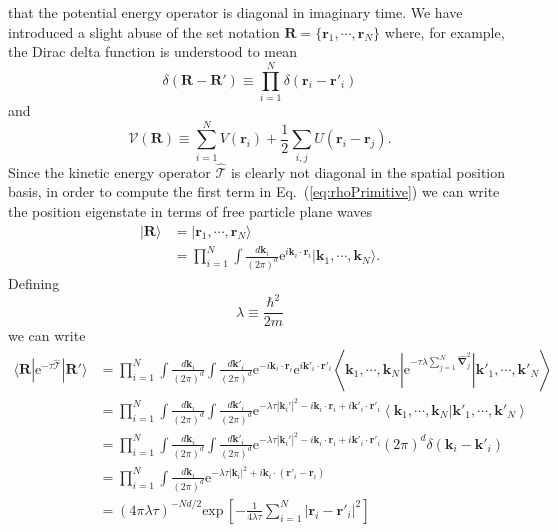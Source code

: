 \documentclass[prb,aps,amssym,nofootinbib,floatfix,notitlepage]{revtex4-1}
\renewcommand{\vec}[1]{\boldsymbol{#1}}
\newcommand{\e}[1]{\mathrm{e}^{#1}}
\renewcommand{\eqref}[1]{Eq.~(\ref{#1})}
\newcommand{\R}{\vec{R}}
\newcommand{\T}{\mathcal{T}}
\begin{document}
that the potential energy operator is diagonal in imaginary time. We have
introduced a slight abuse of the set notation
$\R = \{\vec{r}_1, \cdots, \vec{r}_N \}$ where, for example, the Dirac delta
function is understood to mean
%
\begin{equation}
    \delta(\R-\R') \equiv \prod_{i=1}^{N}\delta(\vec{r}_i-\vec{r}'_i)
\end{equation}
%
and 
%
\begin{equation}
    \mathcal{V}(\R) \equiv \sum_{i=1}^N V(\vec{r}_i) + \frac{1}{2}\sum_{i,j}
U(\vec{r}_i-\vec{r}_j).
\end{equation}
%
Since the kinetic energy operator $\hat{\T}$ is clearly not diagonal in the
spatial position basis, in order to compute the first term in
\eqref{eq:rhoPrimitive} we can write the position eigenstate in terms of free
particle plane waves
%
\begin{align}
    |\R \rangle &=  | \vec{r}_1, \cdots, \vec{r}_N \rangle \nonumber \\
                &= \prod_{i=1}^N \int \frac{d\vec{k}_i}{(2\pi)^d} 
    \e{i \vec{k}_i \cdot \vec{r}_i} | \vec{k}_1, \cdots, \vec{k}_N\rangle.
\end{align}
%
Defining
%
\begin{equation}
    \lambda \equiv \frac{\hbar^2}{2 m}
\end{equation}
%
we can write
%
\begin{align}
    \langle \R | \e{-\tau\hat{\T}}|\R'\rangle &= \prod_{i=1}^N 
    \int \frac{d\vec{k}_i}{(2\pi)^d} \int \frac{d\vec{k}'_i}{(2\pi)^d} 
    \e{-i \vec{k}_i \cdot \vec{r}_i} \e{i \vec{k}'_i \cdot \vec{r}'_i} 
    \left \langle \vec{k}_1, \cdots, \vec{k}_N \left | \e{-\tau \lambda
\sum_{j=1}^N\hat{\vec{\nabla}}_j^2} \right | \vec{k}'_1, \cdots, \vec{k}'_N
\right \rangle \nonumber \\
&= \prod_{i=1}^N\int \frac{d\vec{k}_i}{(2\pi)^d} \int \frac{d\vec{k}'_i}{(2\pi)^d} 
\e{-\lambda \tau |\vec{k}_i'|^2 - i \vec{k}_i \cdot \vec{r}_i + i \vec{k}'_i \cdot
\vec{r}'_i} \left \langle \vec{k}_1, \cdots, \vec{k}_N | \vec{k}'_1, \cdots,
\vec{k}'_N \right \rangle \nonumber \\
&= \prod_{i=1}^N\int \frac{d\vec{k}_i}{(2\pi)^d} \int \frac{d\vec{k}'_i}{(2\pi)^d} 
\e{-\lambda \tau |\vec{k}_i'|^2 - i \vec{k}_i \cdot \vec{r}_i + i \vec{k}'_i \cdot
\vec{r}'_i}  (2\pi)^d \delta(\vec{k}_i-\vec{k}'_i) \nonumber \\
&= \prod_{i=1}^N\int \frac{d\vec{k}_i}{(2\pi)^d} 
\e{-\lambda \tau |\vec{k}_i|^2 + i \vec{k}_i \cdot (\vec{r}'_i - \vec{r}_i)}  
\nonumber \\
&= (4\pi \lambda \tau)^{-Nd/2} \mathrm{exp}\,\left[ -\frac{1}{4\lambda
\tau} \sum_{i=1}^N | \vec{r}_i-\vec{r}'_i|^2 \right] 
\end{align}
\end{document}

